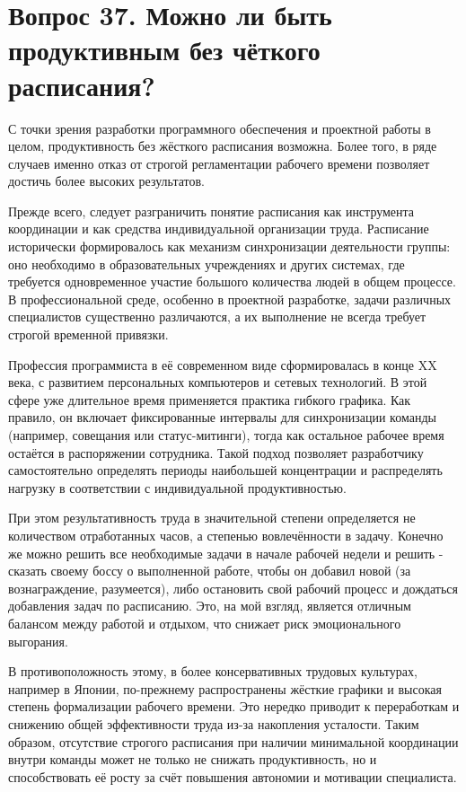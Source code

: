 \documentclass[14pt,a4paper]{extarticle}
\begin{document}
\newpage
\section{Вопрос 37. Можно ли быть продуктивным без чёткого расписания?}

С точки зрения разработки программного обеспечения и проектной работы в целом, продуктивность без жёсткого расписания возможна. Более того, в ряде случаев именно отказ от строгой регламентации рабочего времени позволяет достичь более высоких результатов.

Прежде всего, следует разграничить понятие расписания как инструмента координации и как средства индивидуальной организации труда. Расписание исторически формировалось как механизм синхронизации деятельности группы: оно необходимо в образовательных учреждениях и других системах, где требуется одновременное участие большого количества людей в общем процессе. В профессиональной среде, особенно в проектной разработке, задачи различных специалистов существенно различаются, а их выполнение не всегда требует строгой временной привязки.

Профессия программиста в её современном виде сформировалась в конце XX века, с
развитием персональных компьютеров и сетевых технологий. В этой сфере уже
длительное время применяется практика гибкого графика. Как правило, он включает
фиксированные интервалы для синхронизации команды (например, совещания или
статус-митинги), тогда как остальное рабочее время остаётся в распоряжении
сотрудника. Такой подход позволяет разработчику самостоятельно определять
периоды наибольшей концентрации и распределять нагрузку в соответствии с
индивидуальной продуктивностью.

При этом результативность труда в значительной степени определяется не
количеством отработанных часов, а степенью вовлечённости в задачу. Конечно же
можно решить все необходимые задачи в начале рабочей недели и решить - сказать
своему боссу о выполненной работе, чтобы он добавил новой (за вознаграждение,
разумеется), либо остановить свой рабочий процесс и дождаться добавления задач
по расписанию. Это, на мой взгляд, является отличным балансом между работой и
отдыхом, что снижает риск эмоционального выгорания.

В противоположность этому, в более консервативных трудовых культурах, например
в Японии, по-прежнему распространены жёсткие графики и высокая степень
формализации рабочего времени. Это нередко приводит к переработкам и снижению
общей эффективности труда из-за накопления усталости. Таким образом, отсутствие
строгого расписания при наличии минимальной координации внутри команды может не
только не снижать продуктивность, но и способствовать её росту за счёт
повышения автономии и мотивации специалиста.
\end{document}

